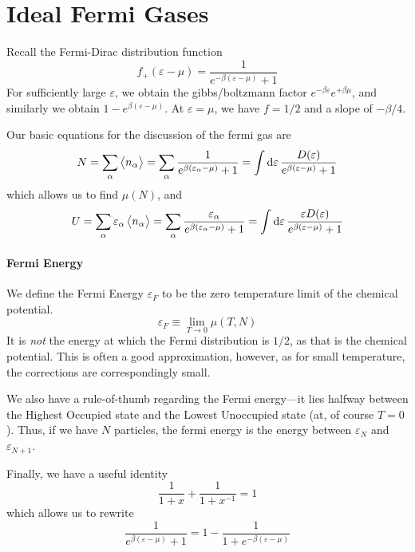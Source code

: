 \chapter{Ideal Fermi Gases}
Recall the Fermi-Dirac distribution function
\[f_+(\varepsilon-\mu) = \frac{1}{e^{-\beta(\varepsilon-\mu)}+1}\]
For sufficiently large \(\varepsilon\), we obtain the gibbs/boltzmann factor \(e^{-\beta\varepsilon}e^{+\beta\mu}\), and similarly we obtain \(1-e^{\beta(\varepsilon-\mu)}\). At \(\varepsilon = \mu\), we have \(f=1/2\) and a slope of \(-\beta/4\).

Our basic equations for the discussion of the fermi gas are
\[N=\sum_\alpha\vect{n_\alpha} = \sum_\alpha \frac{1}{e^{\beta(\varepsilon_\alpha-\mu)}+1} = \int\d{\varepsilon}\frac{D(\varepsilon)}{e^{\beta(\varepsilon-\mu)}+1}\]
which allows us to find \(\mu(N)\), and 
\[U = \sum_\alpha \varepsilon_\alpha\vect{n_\alpha} = \sum_\alpha\frac{\varepsilon_\alpha}{e^{\beta(\varepsilon_\alpha-\mu)}+1} = \int\d{\varepsilon}\frac{\varepsilon D(\varepsilon)}{e^{\beta(\varepsilon-\mu)}+1}\]

\subsubsection{Fermi Energy}
We define the Fermi Energy \(\varepsilon_F\) to be the zero temperature limit of the chemical potential.
\begin{equation}
	\varepsilon_F\equiv \lim_{T\to 0} \mu(T,N)
\end{equation}
It is \emph{not} the energy at which the Fermi distribution is \(1/2\), as that is the chemical potential. This is often a good approximation, however, as for small temperature, the corrections are correspondingly small.

We also have a rule-of-thumb regarding the Fermi energy---it lies halfway between the Highest Occupied state and the Lowest Unoccupied state (at, of course \(T=0\)). Thus, if we have \(N\) particles, the fermi energy is the energy between \(\varepsilon_N\) and \(\varepsilon_{N+1}\).

Finally, we have a useful identity
\[\frac{1}{1+x}+\frac{1}{1+x^{-1}}=1\]
which allows us to rewrite
\[\frac{1}{e^{\beta(\varepsilon-\mu)}+1} = 1-\frac{1}{1+e^{-\beta(\varepsilon-\mu)}}\]

